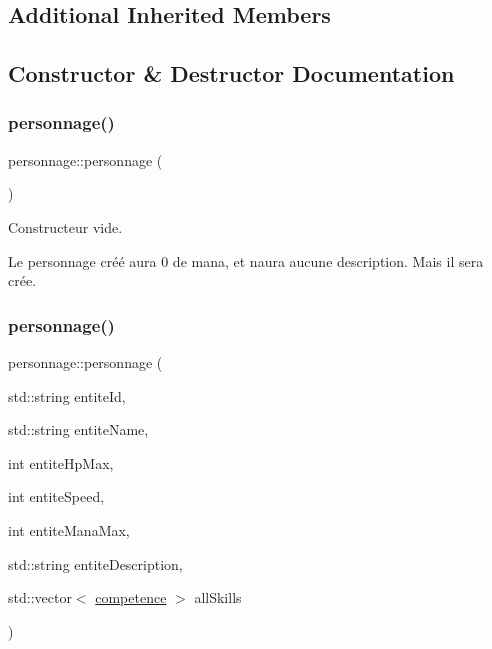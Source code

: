 \subsection*{Additional Inherited Members}


\subsection{Constructor \& Destructor Documentation}
\mbox{\label{classpersonnage_acd9ca516f8c5c110687e5167dab8db59}} 
\subsubsection{\texorpdfstring{personnage()}{personnage()}\hspace{0.1cm}{\footnotesize\ttfamily [1/2]}}
{\footnotesize\ttfamily personnage\+::personnage (\begin{DoxyParamCaption}{ }\end{DoxyParamCaption})\hspace{0.3cm}{\ttfamily [inline]}}



Constructeur vide. 

Le personnage créé aura 0 de mana, et n\textquotesingle{}aura aucune description. Mais il sera crée. \mbox{\label{classpersonnage_adec7b6f38637e7d176e054b68b0fcb23}} 
\subsubsection{\texorpdfstring{personnage()}{personnage()}\hspace{0.1cm}{\footnotesize\ttfamily [2/2]}}
{\footnotesize\ttfamily personnage\+::personnage (\begin{DoxyParamCaption}\item[{std\+::string}]{entite\+Id,  }\item[{std\+::string}]{entite\+Name,  }\item[{int}]{entite\+Hp\+Max,  }\item[{int}]{entite\+Speed,  }\item[{int}]{entite\+Mana\+Max,  }\item[{std\+::string}]{entite\+Description,  }\item[{std\+::vector$<$ \hyperlink{classcompetence}{competence} $>$}]{all\+Skills }\end{DoxyParamCaption})\hspace{0.3cm}{\ttfamily [inline]}}



